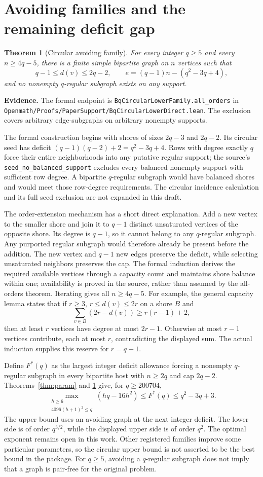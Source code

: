 \documentclass[11pt]{article}
\newtheorem{theorem}{Theorem}
\newcommand{\status}[1]{\par\noindent\textcolor{blue!45!black}{\textbf{Evidence.} #1}\par}
\begin{document}
\section{Avoiding families and the remaining deficit gap}
\begin{theorem}[Circular avoiding family]\label{thm:avoid}
For every integer $q\ge5$ and every $n\ge4q-5$, there is a finite simple bipartite graph on $n$ vertices such that
\[
 q-1\le d(v)\le2q-2,\qquad
 e=(q-1)n-(q^2-3q+4),
\]
and no nonempty $q$-regular subgraph exists on any support.
\end{theorem}
\status{The formal endpoint is \nolinkurl{BqCircularLowerFamily.all_orders} in \nolinkurl{Openmath/Proofs/PaperSupport/BqCircularLowerDirect.lean}. The exclusion covers arbitrary edge-subgraphs on arbitrary nonempty supports.}

The formal construction begins with shores of sizes $2q-3$ and $2q-2$. Its circular seed has deficit $(q-1)(q-2)+2=q^2-3q+4$. Rows with degree exactly $q$ force their entire neighborhoods into any putative regular support; the source's \nolinkurl{seed_no_balanced_support} excludes every balanced nonempty support with sufficient row degree. A bipartite $q$-regular subgraph would have balanced shores and would meet those row-degree requirements. The circular incidence calculation and its full seed exclusion are not expanded in this draft.

The order-extension mechanism has a short direct explanation. Add a new vertex to the smaller shore and join it to $q-1$ distinct unsaturated vertices of the opposite shore. Its degree is $q-1$, so it cannot belong to any $q$-regular subgraph. Any purported regular subgraph would therefore already be present before the addition. The new vertex and $q-1$ new edges preserve the deficit, while selecting unsaturated neighbors preserves the cap. The formal induction derives the required available vertices through a capacity count and maintains shore balance within one; availability is proved in the source, rather than assumed by the all-orders theorem. Iterating gives all $n\ge4q-5$. For example, the general capacity lemma states that if $r\ge3$, $r\le d(v)\le2r$ on a shore $B$ and
\[
 \sum_{v\in B}(2r-d(v))\ge r(r-1)+2,
\]
then at least $r$ vertices have degree at most $2r-1$. Otherwise at most $r-1$ vertices contribute, each at most $r$, contradicting the displayed sum. The actual induction supplies this reserve for $r=q-1$.

Define $F^*(q)$ as the largest integer deficit allowance forcing a nonempty $q$-regular subgraph in every bipartite host with $n\ge2q$ and cap $2q-2$. Theorems~\ref{thm:param} and \ref{thm:avoid} give, for $q\ge200704$,
\[
 \max_{\substack{h\ge6\\4096(h+1)^2\le q}}
       (hq-16h^2)
 \le F^*(q)\le q^2-3q+3.
\]
The upper bound uses an avoiding graph at the next integer deficit. The lower side is of order $q^{3/2}$, while the displayed upper side is of order $q^2$. The optimal exponent remains open in this work. Other registered families improve some particular parameters, so the circular upper bound is not asserted to be the best bound in the package. For $q\ge5$, avoiding a $q$-regular subgraph does not imply that a graph is pair-free for the original problem.
\end{document}
